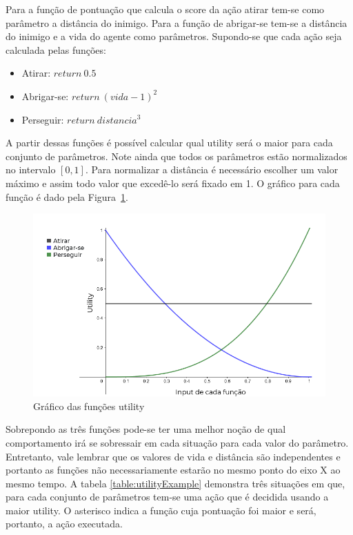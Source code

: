 \documentclass[12pt, 
openright, 
oneside, 
a4paper,    
brazil]{facom-ufu-abntex2}
\begin{document}
Para a função de pontuação que calcula o score da ação atirar tem-se como parâmetro a distância do inimigo. Para a função de abrigar-se tem-se a distância do inimigo e a vida do agente como parâmetros. Supondo-se que cada ação seja calculada pelas funções:

\begin{itemize}
    \item Atirar: $return~0.5$
    \item Abrigar-se: $return~(vida - 1)^2$
    \item Perseguir: $return~distancia^3$
\end{itemize}

 A partir dessas funções é possível calcular qual utility será o maior para cada conjunto de parâmetros. Note ainda que todos os parâmetros estão normalizados no intervalo $[0,1]$. Para normalizar a distância é necessário escolher um valor máximo e assim todo valor que excedê-lo será fixado em 1. O gráfico para cada função é dado pela Figura~\ref{fig:utilityFunctions}.
 
\begin{figure}[H]
	\centering
	\includegraphics[width=34em]{imagens/utilityFunctions.png}
	\caption{Gráfico das funções utility}
	\label{fig:utilityFunctions}
\end{figure}

 
 Sobrepondo as três funções pode-se ter uma melhor noção de qual comportamento irá se sobressair em cada situação para cada valor do parâmetro. Entretanto, vale lembrar que os valores de vida e distância são independentes e portanto as funções não necessariamente estarão no mesmo ponto do eixo X ao mesmo tempo.
 A tabela \ref{table:utilityExample} demonstra três situações em que, para cada conjunto de parâmetros tem-se uma ação que é decidida usando a maior utility. O asterisco indica a função cuja pontuação foi maior e será, portanto, a ação executada.
 
\end{document}
